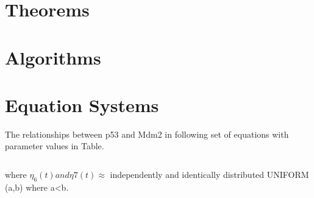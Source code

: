 \documentclass[preprint, 8pt]{elsarticle}
\theoremstyle{definition}
\begin{document}
\section{Theorems}

\section{Algorithms}

\section{Equation Systems}

The relationships between p53 and Mdm2 in following set of equations with parameter values in Table.  
\centering
\small
\vspace{4pt}
	\begin{equation}
	\end{equation}
	\begin{equation}
	\begin{split}
	\end{split}
	\end{equation}
	\begin{equation}
	\begin{split}
	\end{split}
	\end{equation} 
	\vspace{4pt}
\raggedright
where $\eta_{6}(t) and \eta{7}(t) \approx$ independently and identically distributed UNIFORM (a,b) where a<b. 
\centering
\end{document}
